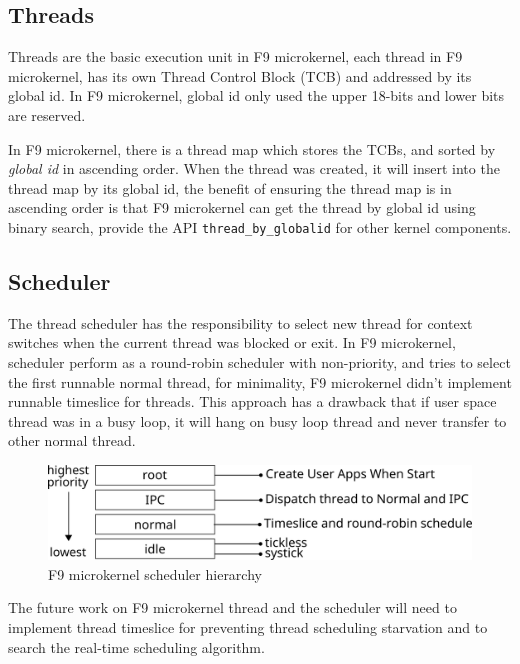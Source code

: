 \documentclass[10pt,preprint,nocopyrightspace]{sigplanconf}
\begin{document}
\subsection{Threads}

Threads are the basic execution unit in F9 microkernel, each thread in F9 microkernel, has its own Thread Control Block (TCB) and addressed by its global id. In F9 microkernel, global id only used the upper 18-bits and lower bits are reserved.

In F9 microkernel, there is a thread map which stores the TCBs, and sorted by \textit{global id} in ascending order. When the thread was created, it will insert into the thread map by its global id, the benefit of ensuring the thread map is in ascending order is that F9 microkernel can get the thread by global id using binary search, provide the API \verb|thread_by_globalid| for other kernel components.

\subsection{Scheduler}

The thread scheduler has the responsibility to select new thread for context switches when the current thread was blocked or exit. In F9 microkernel, scheduler perform as a round-robin scheduler with non-priority, and tries to select the first runnable normal thread, for minimality, F9 microkernel didn't implement runnable timeslice for threads. This approach has a drawback that if user space thread was in a busy loop, it will hang on busy loop thread and never transfer to other normal thread.

\begin{figure}[H]
	\begin{center}
		\includegraphics[width=\linewidth]{picture/scheduler.png}
	\end{center}
	\caption{F9 microkernel scheduler hierarchy}
\end{figure}

The future work on F9 microkernel thread and the scheduler will need to implement thread timeslice for preventing thread scheduling starvation and to search the real-time scheduling algorithm.
\end{document}
